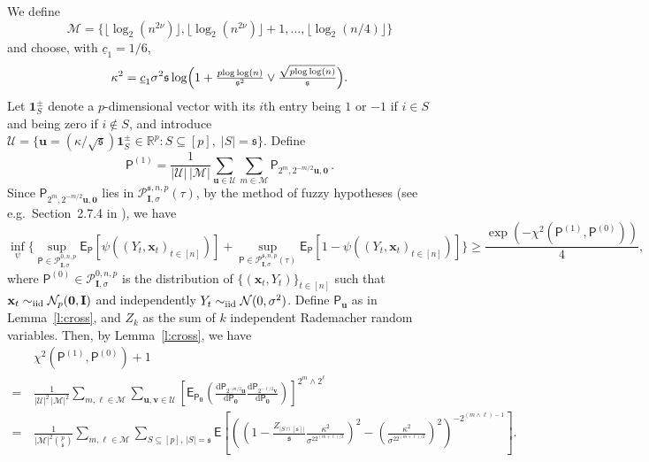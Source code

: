 \documentclass[11pt, a4paper]{article}
\newcommand{\mbf}{\mathbf}
\newcommand{\mc}{\mathcal}
\renewcommand{\l}{\left}
\renewcommand{\r}{\right}
\newcommand{\E}[0]{\mathsf{E}}
\newcommand{\p}{\mathsf{P}}
\newcommand{\R}{\mathbb{R}}
\newcommand{\iid}{\text{\upshape iid}}
\theoremstyle{definition}
\theoremstyle{definition}
\theoremstyle{definition}
\theoremstyle{definition}
\theoremstyle{definition}
\theoremstyle{remark}
\theoremstyle{definition}
\theoremstyle{definition}
\theoremstyle{definition}
\begin{document}
We define 
$$
\mc{M} = \bigl\{\lfloor\log_2(n^{2\nu})\rfloor, \lfloor\log_2(n^{2\nu})\rfloor+1,\ldots, \lfloor \log_2(n/4) \rfloor\bigr\}
$$ 
and choose, with $\underline{c}_1 = 1/6$,
\[
\kappa^2 = \underline{c}_1\sigma^2\mathfrak{s} \log\Bigl(1 + \tfrac{p {\log\log(n)}}{\mathfrak{s}^2}\vee\tfrac{\sqrt{p {\log\log(n)}}}{\mathfrak{s}}\Bigr).
\]
Let $\mathbf{1}^{\pm}_S$ denote a $p$-dimensional vector with its $i$th entry being $1$ or $-1$ if $i \in S$ and being zero if $i \not\in S$, and introduce $\mathcal{U} = \bigl\{\bm{u} = ({\kappa}/{\sqrt{\mathfrak{s}}})\mathbf{1}^{\pm}_S \in \R^p:  S \subseteq [p],  \; \vert S \vert = \mathfrak{s} \bigr\}$. Define
\[
\p^{(1)} = \frac{1}{\vert\mc U\vert\,\vert\mc M\vert} \sum_{\bm{u} \in \mathcal{U}} \sum_{m \in \mc{M}}\p_{2^m,  2^{-{m}/{2}}\bm u , \bm 0}\,.
\]
Since $\p_{2^m,  2^{-{m}/{2}}\bm u , \bm 0}$ lies in $\mc P^{\mathfrak{s}, n, p}_{\mbf I, \sigma}(\tau)$, by the method of fuzzy hypotheses (see e.g.\ Section~2.7.4 in \citealp{Tsy09}), we have
$$
\inf_{\psi}\biggl\{  \sup_{\p \in \mc P_{\mbf I, \sigma}^{0, n, p}} \E_{\p}\l[\psi\l((Y_t, \mbf x_t)_{t\in[n]}\r)\r]  +  \sup_{\p \in \mc P_{\mbf I, \sigma}^{\mathfrak{s}, n, p}(\tau)} \E_{\p}\l[1-\psi\l((Y_t, \mbf x_t)_{t\in[n]}\r)\r]\biggr\} \ge \frac{\exp\l(-\chi^2(\p^{(1)},\p^{(0)})\r)}{4},
$$
where  $\p^{(0)} \in \mc P_{\mbf I, \sigma}^{0, n, p} $ is the distribution of $\{(\mbf x_t,  Y_t)\}_{t\in [n]}$ such that  $\mbf x_t \sim_{\iid} \mc N_p(\mbf 0, \mbf I)$ and
independently  $Y_t \sim_{\iid}\mc N (0,\sigma^2)$.  
Define $\p_{\bm u}$ as in Lemma~\ref{l:cross}, and $Z_k$ as the sum of $k$ independent Rademacher random variables. Then, by Lemma~\ref{l:cross},  we have 
\begin{align*}
& \chi^2(\p^{(1)},\p^{(0)}) + 1 \\
=\, &\frac{1}{\vert\mc U\vert^2\,\vert\mc M\vert^2}\sum_{m, \ell \in \mc M}\sum_{\bm u, \bm v \in \mc U} \l[\E_{\p_{\bm0}}\l(\frac{\mathrm{d}\p_{2^{-{m}/{2}}\bm u}}{\mathrm{d}\p_{\bm 0}}\frac{\mathrm{d}\p_{2^{-{\ell}/{2}}\bm v}}{\mathrm{d}\p_{\bm 0}}\r)\r]^{2^m\wedge 2^\ell}  \\
 =\, & \frac{1}{\vert\mc M\vert^2{p \choose \mathfrak{s}}}\sum_{m, \ell \in \mc M} \sum_{S \subseteq [p],\, \vert S\vert = \mathfrak{s}} \E\l[\l(\l(1-\frac{Z_{\vert S \cap [\mathfrak s]\vert}}{\mathfrak{s}}\frac{\kappa^2}{\sigma^22^{(m+\ell)/2}}\r)^2 - \l(\frac{\kappa^2}{\sigma^22^{(m+\ell)/2}}\r)^2\r)^{-2^{(m\wedge \ell) -1}}\r].
\end{align*}
\end{document}
